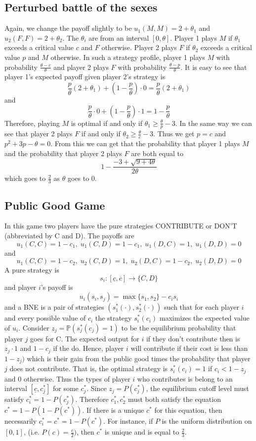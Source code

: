 \documentclass[a4paper, 12pt]{article}
\theoremstyle{plain}
\theoremstyle{definition}
\theoremstyle{lemma}
\theoremstyle{remark}
\theoremstyle{corollary}
\theoremstyle{example}
\begin{document}
	\subsection{Perturbed battle of the sexes}
	Again, we change the payoff slightly to be $u_1(M,M) = 2+\theta_1$ and $u_2(F,F) = 2+\theta_2$. The $\theta_i$ are from an interval $[0,\theta]$. Player 1 plays $M$ if $\theta_1$ exceeds a critical value $c$ and $F$ otherwise. Player 2 plays $F$ if $\theta_2$ exceeds a critical value $p$ and $M$ otherwise. In such a strategy profile, player 1 plays $M$ with probability $\frac{\theta-c}{\theta}$ and player 2 plays $F$ with probability $\frac{\theta-p}{\theta}$. It is easy to see that player 1's expected payoff given player 2's strategy is \[\frac{p}{\theta}(2+\theta_1) + (1-\frac{p}{\theta})\cdot 0 = \frac{p}{\theta}(2+\theta_1)\] and \[\frac{p}{\theta}\cdot 0 + (1-\frac{p}{\theta})\cdot 1 = 1-\frac{p}{\theta}\] Therefore, playing $M$ is optimal if and only if $\theta_1 \geq \frac{\theta}{p}-3$. In the same way we can see that player 2 plays $F$ if and only if $\theta_2 \geq \frac{\theta}{c}-3$. Thus we get $p=c$ and $p^2 + 3p -\theta = 0$. From this we can get that the probability that player 1 plays $M$ and the probability that player 2 plays $F$ are both equal to \[1-\frac{-3 + \sqrt{9+4\theta}}{2\theta}\] which goes to $\frac{2}{3}$ as $\theta$ goes to $0$.
	\subsection{Public Good Game}
	In this game two players have the pure strategies CONTRIBUTE or DON'T (abbreviated by C and D). The payoffs are \[u_1(C,C) = 1-c_1, \; u_1(C,D) = 1-c_1, \; u_1(D,C) = 1, \; u_1(D,D) = 0\]
	and \[u_1(C,C) = 1-c_2, \; u_2(C,D) = 1,\; u_2(D,C) = 1-c_2, \; u_2(D,D) = 0\]
	A pure strategy is \[s_i: [\underline{c}, \overline{c}] \to \{C,D\}\] and player $i$'s payoff is \[u_i(s_i,s_j) = \max\{s_1,s_2\}-c_is_i\] and a BNE is a pair of strategies $(s_1^*(\cdot), s_2^*(\cdot))$ such that for each player $i$ and every possible value of $c_i$ the strategy $s_i^*(c_i)$ maximizes the expected value of $u_i$. Consider $z_j = \mathbb{P}(s_j^*(c_j) = 1)$ to be the equilibrium probability that player $j$ goes for C. The expected output for $i$ if they don't contribute then is $z_j\cdot 1$ and $1-c_j$ if the do. Hence, player $i$ will contribute if their cost is less than $1-z_j)$ which is their gain from the public good times the probability that player $j$ does not contribute. That is, the optimal strategy is $s_i^*(c_i) = 1$ if $c_i < 1-z_j$ and 0 otherwise. Thus the types of player $i$ who contributes is belong to an interval $[\underline{c},c_j^*]$ for some $c_j^*$. Since $z_j = P(c_j^*)$, the equilibrium cutoff level must satisfy $c_i^* = 1-P(c_j^*)$. Therefore $c_1^*,c_2^*$ must both satisfy the equation $c^* = 1-P(1-P(c^*))$. If there is a unique $c^*$ for this equation, then necessarily $c_i^* = c^* = 1-P(c^*)$. For instance, if $P$ is the uniform distribution on $[0,1]$, (i.e. $P(c) = \frac{c}{2})$, then $c^*$ is unique and is equal to $\frac{2}{3}$.
\end{document}
